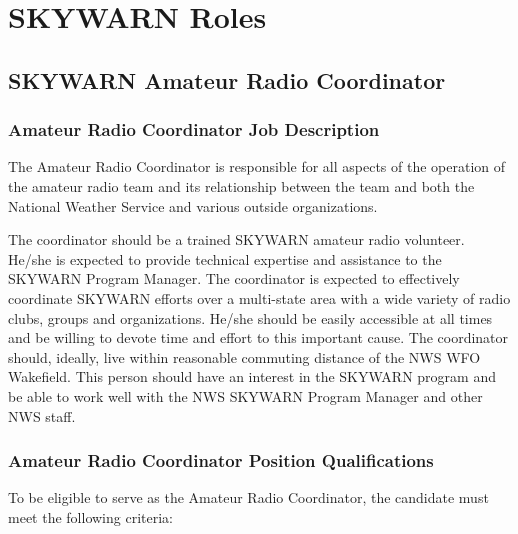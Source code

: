 \documentclass[pdflatex,letterpaper,twoside,12pt]{book}
\begin{document}
\chapter{SKYWARN Roles}\label{skywarn-roles}


\section{SKYWARN Amateur Radio Coordinator}

\subsection{Amateur Radio Coordinator Job Description}\label{arc-jobdesc}

The Amateur Radio Coordinator is responsible for all aspects of the operation of the amateur radio team and its relationship between the team and both the National Weather Service and various outside organizations.

The coordinator should be a trained SKYWARN amateur radio volunteer.  He/she is expected to provide technical expertise and assistance to the SKYWARN Program Manager.  The coordinator is expected to effectively coordinate SKYWARN efforts over a multi-state area with a wide variety of radio clubs, groups and organizations.  He/she should be easily accessible at all times and be willing to devote time and effort to this important cause.  The coordinator should, ideally, live within reasonable commuting distance of the NWS WFO Wakefield.  This person should have an interest in the SKYWARN program and be able to work well with the NWS SKYWARN Program Manager and other NWS staff. 

\subsection{Amateur Radio Coordinator Position Qualifications}

To be eligible to serve as the Amateur Radio Coordinator, the candidate must meet the following criteria:
\end{document}
